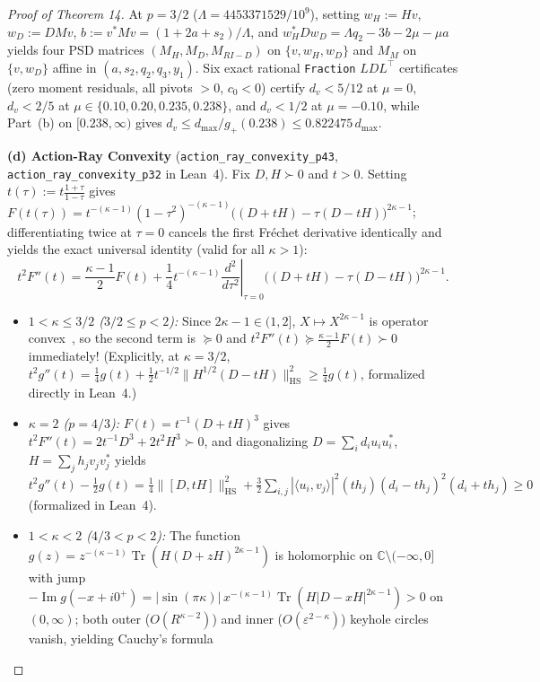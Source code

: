 \documentclass[10pt,letterpaper]{article}
\newcommand{\C}{\mathbb{C}}
\newcommand{\Tr}{\operatorname{Tr}}
\newcommand{\HS}{\mathrm{HS}}
\begin{document}
\begin{proof}[Proof of Theorem 14]
At $p = 3/2$ ($\Lambda = 4453371529/10^9$), setting $w_H := Hv$, $w_D := DMv$, $b := v^* M v = (1+2a+s_2)/\Lambda$, and $w_H^* D w_D = \Lambda q_2 - 3b - 2\mu - \mu a$ yields four PSD matrices $(M_H, M_D, M_{RI-D})$ on $\{v, w_H, w_D\}$ and $M_M$ on $\{v, w_D\}$ affine in $(a, s_2, q_2, q_3, y_1)$. Six exact rational \texttt{Fraction} $LDL^\top$ certificates (zero moment residuals, all pivots $> 0$, $c_0 < 0$) certify $d_v < 5/12$ at $\mu = 0$, $d_v < 2/5$ at $\mu \in \{0.10, 0.20, 0.235, 0.238\}$, and $d_v < 1/2$ at $\mu = -0.10$, while Part~(b) on $[0.238, \infty)$ gives $d_v \le d_{\max}/g_+(0.238) \le 0.822475\,d_{\max}$.

\textbf{(d) Action-Ray Convexity} (\texttt{action\_ray\_convexity\_p43}, \texttt{action\_ray\_convexity\_p32} in Lean~4).
Fix $D, H \succ 0$ and $t > 0$. Setting $t(\tau) := t\frac{1+\tau}{1-\tau}$ gives $F(t(\tau)) = t^{-(\kappa-1)}(1-\tau^2)^{-(\kappa-1)}\bigl((D+tH) - \tau(D-tH)\bigr)^{2\kappa-1}$; differentiating twice at $\tau = 0$ cancels the first Fr\'echet derivative identically and yields the exact universal identity (valid for all $\kappa > 1$):
\[
  t^2 F''(t) = \frac{\kappa - 1}{2} F(t) + \frac{1}{4} t^{-(\kappa - 1)}\left.\frac{d^2}{d\tau^2}\right|_{\tau=0}\bigl((D + tH) - \tau(D - tH)\bigr)^{2\kappa - 1}.
\]
\begin{itemize}[leftmargin=1.5em,itemsep=1.5pt]
  \item \emph{$1 < \kappa \le 3/2$ ($3/2 \le p < 2$):} Since $2\kappa - 1 \in (1, 2]$, $X \mapsto X^{2\kappa - 1}$ is operator convex~\cite{Bhatia1997}, so the second term is $\succeq 0$ and $t^2 F''(t) \succeq \frac{\kappa-1}{2} F(t) \succ 0$ immediately! (Explicitly, at $\kappa = 3/2$, $t^2 g''(t) = \frac{1}{4}g(t) + \frac{1}{2}t^{-1/2}\|H^{1/2}(D - tH)\|_{\HS}^2 \ge \frac{1}{4}g(t)$, formalized directly in Lean~4.)
  \item \emph{$\kappa = 2$ ($p = 4/3$):} $F(t) = t^{-1}(D + tH)^3$ gives $t^2 F''(t) = 2t^{-1}D^3 + 2t^2 H^3 \succ 0$, and diagonalizing $D = \sum_i d_i u_i u_i^*$, $H = \sum_j h_j v_j v_j^*$ yields $t^2 g''(t) - \frac{1}{2}g(t) = \frac{1}{4}\|[D, tH]\|_{\HS}^2 + \frac{3}{2}\sum_{i,j}|\langle u_i, v_j\rangle|^2 (t h_j)(d_i - t h_j)^2(d_i + t h_j) \ge 0$ (formalized in Lean~4).
  \item \emph{$1 < \kappa < 2$ ($4/3 < p < 2$):} The function $g(z) = z^{-(\kappa-1)}\Tr(H(D+zH)^{2\kappa-1})$ is holomorphic on $\C \setminus (-\infty, 0]$ with jump $-\operatorname{Im} g(-x + i0^+) = |\sin(\pi\kappa)|\, x^{-(\kappa-1)}\Tr(H|D - xH|^{2\kappa-1}) > 0$ on $(0, \infty)$; both outer ($O(R^{\kappa-2})$) and inner ($O(\varepsilon^{2-\kappa})$) keyhole circles vanish, yielding Cauchy's formula

\end{itemize}
\end{proof}
\end{document}
